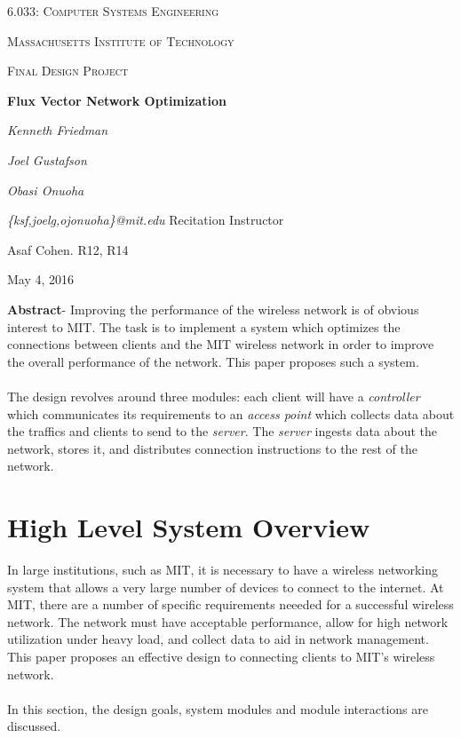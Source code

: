\documentclass[10pt,journal,compsoc]{IEEEtran}
\begin{document}
\begin{titlepage}
	\centering
	{\scshape 6.033: Computer Systems Engineering  \par}
	\vspace{3cm}
	{\scshape\LARGE Massachusetts Institute of Technology \par}
	\vspace{1cm}
	{\scshape\Large Final Design Project \par}
	\vspace{1.5cm}
	{\huge\bfseries Flux Vector Network Optimization\par}
	\vspace{2cm}
	{\Large\itshape Kenneth Friedman\par}
		{\Large\itshape Joel Gustafson \par}
			{\Large\itshape Obasi Onuoha \par}
	\vspace{.25cm}
	\textit{{\small\{ksf,joelg,ojonuoha\}@mit.edu}}
	\vfill
	Recitation Instructor\par
	Asaf Cohen. R12, R14

	\vfill

	{\large May 4, 2016\par}
\end{titlepage}

		
	
	    \textbf{Abstract}- Improving the performance of the wireless network is of obvious interest to MIT. The task is to implement a system which optimizes the connections between clients and the MIT wireless network in order to improve the overall performance of the network. This paper proposes such a system.\\
		\\
		The design revolves around three modules: each client will have a \emph{controller} which communicates its requirements to an \emph{access point} which collects data about the traffics and clients to send to the \emph{server}. The \emph{server} ingests data about the network, stores it, and distributes connection instructions to the rest of the network.
		
		\section{High Level System Overview}
		
		In large institutions, such as MIT, it is necessary to have a wireless networking system that allows a very large number of devices to connect to the internet. At MIT, there are a number of specific requirements neeeded for a successful wireless network. The network must have acceptable performance, allow for high network utilization under heavy load, and collect data to aid in network management. This paper proposes an effective design to connecting clients to MIT's wireless network.\\
        \\
        In this section, the design goals, system modules and module interactions are discussed.
        
\end{document}
